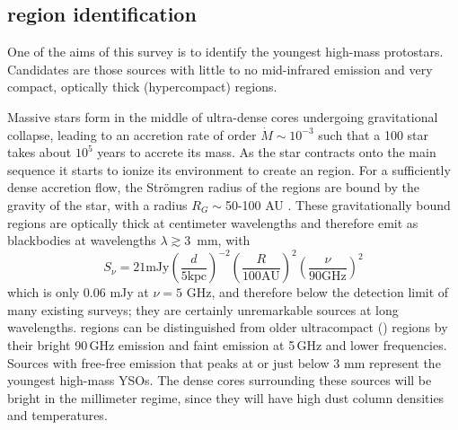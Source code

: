 \documentclass[twocolumn]{aastex62}
\begin{document}


\subsection{\hchii region identification}
\label{sec:hiireg}
One of the aims of this survey is to identify the youngest high-mass
protostars.  Candidates are those sources with little to no mid-infrared emission
and very compact, optically thick (hypercompact) \hii regions.

Massive stars form in the middle of ultra-dense cores undergoing gravitational
collapse, leading to an accretion rate of order $\dot{M} \sim 10^{-3}$ \msun
\peryr such that a 100 \msun star takes about $10^5$ years to accrete its mass.
As the star contracts onto the main sequence it starts to ionize its
environment to create an \hchii region.  For a sufficiently dense accretion
flow, the Str{\"o}mgren radius of the \hchii regions are bound by the gravity of
the star, with a radius $R_G \sim$50-100 AU
\citep{Keto2002a,Keto2003a,Keto2007a}.  These gravitationally bound \hchii
regions are optically thick at centimeter wavelengths and therefore emit as
blackbodies at wavelengths $\lambda\gtrsim$3~mm, with 
\begin{equation}
    S_\nu=21 \textrm{mJy} \left(\frac{d}{5
    \textrm{kpc}}\right)^{-2} \left(\frac{R}{100 \textrm{AU}}\right)^2 \left(\frac{\nu}{90 \textrm{GHz}}\right)^2
\end{equation}
which is only
0.06 mJy at $\nu=5$ GHz, and therefore below the detection limit of many
existing surveys; they are certainly unremarkable sources at long wavelengths.
\hchii regions can be distinguished from older
ultracompact (\uchii) regions by their  bright 90\,GHz emission and faint emission at 5\,GHz and lower
frequencies.  Sources
with free-free emission that peaks at or just below 3 mm represent the youngest
high-mass YSOs.  The dense cores surrounding these sources will be bright
in the millimeter regime, since they will have high dust column densities and
temperatures.
\end{document}
